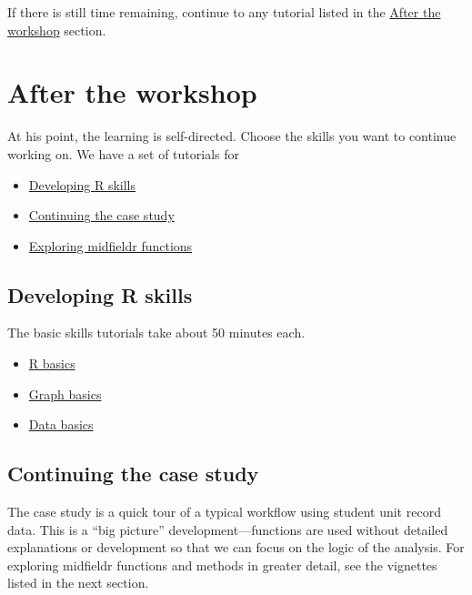 \documentclass[
]{book}
\providecommand{\tightlist}{%
  \setlength{\itemsep}{0pt}\setlength{\parskip}{0pt}}
\begin{document}
If there is still time remaining, continue to any tutorial listed in the \protect\hyperlink{after-the-workshop}{After the workshop} section.

\hypertarget{after-the-workshop}{%
\section{After the workshop}\label{after-the-workshop}}

At his point, the learning is self-directed. Choose the skills you want to continue working on. We have a set of tutorials for

\begin{itemize}
\tightlist
\item
  \protect\hyperlink{developing-r-skills}{Developing R skills}
\item
  \protect\hyperlink{continuing-the-case-study}{Continuing the case study}
\item
  \protect\hyperlink{exploring-midfieldr-functions}{Exploring midfieldr functions}
\end{itemize}

\hypertarget{developing-r-skills}{%
\subsection{Developing R skills}\label{developing-r-skills}}

The basic skills tutorials take about 50 minutes each.

\begin{itemize}
\tightlist
\item
  \protect\hyperlink{R-basics}{R basics}
\item
  \protect\hyperlink{graph-basics}{Graph basics}\\
\item
  \protect\hyperlink{data-basics}{Data basics}
\end{itemize}

\hypertarget{continuing-the-case-study}{%
\subsection{Continuing the case study}\label{continuing-the-case-study}}

The case study is a quick tour of a typical workflow using student unit record data. This is a ``big picture'' development---functions are used without detailed explanations or development so that we can focus on the logic of the analysis. For exploring midfieldr functions and methods in greater detail, see the vignettes listed in the next section.
\end{document}
